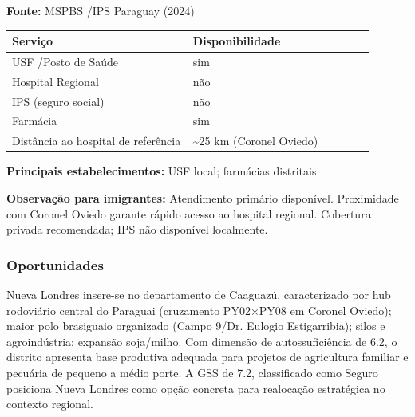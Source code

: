 \textbf{Fonte:} MSPBS /\allowbreak  IPS Paraguay (2024)

{\def\LTcaptype{none} %
\begin{longtable}{@{}>{\raggedright\arraybackslash}p{0.45\linewidth} >{\raggedright\arraybackslash}p{0.45\linewidth}@{}}
\toprule\noalign{}
Serviço & Disponibilidade \\
\midrule\noalign{}
\endhead
\bottomrule\noalign{}
\endlastfoot
USF /\allowbreak  Posto de Saúde & sim \\
Hospital Regional & não \\
IPS (seguro social) & não \\
Farmácia & sim \\
Distância ao hospital de referência & \textasciitilde25 km (Coronel
Oviedo) \\
\end{longtable}
}

\textbf{Principais estabelecimentos:} USF local; farmácias distritais.

\textbf{Observação para imigrantes:} Atendimento primário disponível.
Proximidade com Coronel Oviedo garante rápido acesso ao hospital
regional. Cobertura privada recomendada; IPS não disponível localmente.
\newpage

\subsubsection*{Oportunidades}\label{oport-nueva-londres-0508}
Nueva Londres insere-se no departamento de Caaguazú, caracterizado por hub rodoviário central do Paraguai (cruzamento PY02×PY08 em Coronel Oviedo); maior polo brasiguaio organizado (Campo 9/Dr. Eulogio Estigarribia); silos e agroindústria; expansão soja/milho. Com dimensão de autossuficiência de 6.2, o distrito apresenta base produtiva adequada para projetos de agricultura familiar e pecuária de pequeno a médio porte. A GSS de 7.2, classificado como Seguro posiciona Nueva Londres como opção concreta para realocação estratégica no contexto regional.

